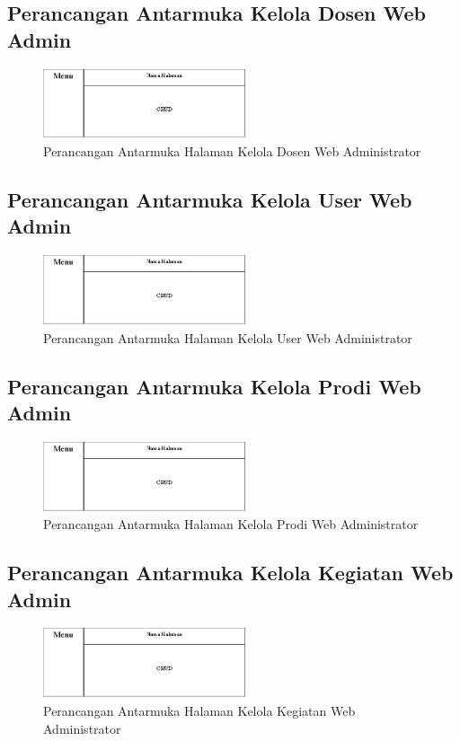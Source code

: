 \subsection{Perancangan Antarmuka Kelola Dosen Web Admin}
	\begin{figure}[H]
		\includegraphics[width=6cm]{figures/diagram/image114.png}
		\centering
		\caption{Perancangan Antarmuka Halaman Kelola Dosen Web Administrator}
	\end{figure}
\subsection{Perancangan Antarmuka Kelola User Web Admin}
	\begin{figure}[H]
		\includegraphics[width=6cm]{figures/diagram/image114.png}
		\centering
		\caption{Perancangan Antarmuka Halaman Kelola User Web Administrator}
	\end{figure}
\subsection{Perancangan Antarmuka Kelola Prodi  Web Admin}
	\begin{figure}[H]
		\includegraphics[width=6cm]{figures/diagram/image114.png}
		\centering
		\caption{Perancangan Antarmuka Halaman Kelola Prodi Web Administrator}
	\end{figure}
\subsection{Perancangan Antarmuka Kelola Kegiatan Web Admin}
	\begin{figure}[H]
		\includegraphics[width=6cm]{figures/diagram/image114.png}
		\centering
		\caption{Perancangan Antarmuka Halaman Kelola Kegiatan  Web Administrator}
	\end{figure}
